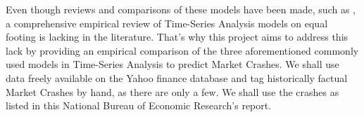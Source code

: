 \documentclass[12pt, letterpaper]{article}
\begin{document}
Even though reviews and comparisons of these models have been made, such as \cite{Okpeke}, a comprehensive empirical review of Time-Series Analysis models on equal footing is lacking in the literature. 
That's why this project aims to address this lack by providing an empirical comparison of the three aforementioned commonly used models in Time-Series Analysis to predict Market Crashes. \cite{Ahmed} \cite{ArunKumar}
We shall use data freely available on the Yahoo finance database and tag historically factual Market Crashes by hand, as there are only a few. We shall use the crashes as listed in this National Bureau of Economic Research's report. \cite{Mishkin}







\end{document}
